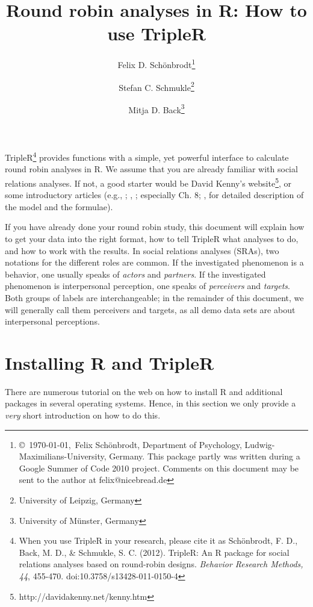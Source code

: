 \documentclass[a4paper]{article}\usepackage[]{graphicx}\usepackage[]{color}
\title{Round robin analyses in R: How to use TripleR}
\author{Felix D. Sch\"onbrodt\thanks{\copyright~\today,~Felix Sch\"onbrodt, Department of Psychology, Ludwig-Maximilians-University, Germany. This package partly was written during a Google Summer of Code 2010 project. Comments on this document may be sent to the author at felix@nicebread.de}
\and Stefan C. Schmukle\thanks{University of Leipzig, Germany}
\and Mitja D. Back\thanks{University of Münster, Germany}}
\begin{document}
	
\maketitle
\tableofcontents
\setcounter{tocdepth}{2}
\clearpage

TripleR\footnote{When you use TripleR in your research, please cite it as Schönbrodt, F. D., Back, M. D.,  \& Schmukle, S. C. (2012). TripleR: An R package for social relations analyses based on round-robin designs. \emph{Behavior Research Methods, 44}, 455-470. doi:10.3758/s13428-011-0150-4
} provides functions with a simple, yet powerful interface to calculate round robin analyses in R. We assume that you are already familiar with social relations analyses. If not, a good starter would be David Kenny's website\footnote{http://davidakenny.net/kenny.htm}, or some introductory articles (e.g., ; , ; especially Ch. 8; , for detailed description of the model and the formulae). 

If you have already done your round robin study, this document will explain how to get your data into the right format, how to tell TripleR what analyses to do, and how to work with the results. In social relations analyses (SRAs), two notations for the different roles are common. If the investigated phenomenon is a behavior, one usually speaks of \emph{actors} and \emph{partners}. If the investigated phenomenon is interpersonal perception, one speaks of \emph{perceivers} and \emph{targets}. Both groups of labels are interchangeable; in the remainder of this document, we will generally call them perceivers and targets, as all demo data sets are about interpersonal perceptions.

\section{Installing R and TripleR}

There are numerous tutorial on the web on how to install R and additional packages in several operating systems. Hence, in this section we only provide a \emph{very} short introduction on how to do this.
\end{document}
